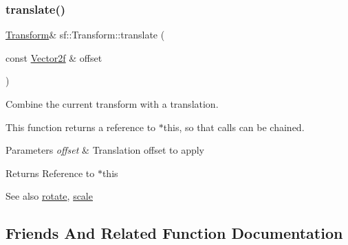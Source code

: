 \subsubsection{\texorpdfstring{translate()}{translate()}\hspace{0.1cm}{\footnotesize\ttfamily [2/2]}}
{\footnotesize\ttfamily \mbox{\hyperlink{classsf_1_1_transform}{Transform}}\& sf\+::\+Transform\+::translate (\begin{DoxyParamCaption}\item[{const \mbox{\hyperlink{classsf_1_1_vector2}{Vector2f}} \&}]{offset }\end{DoxyParamCaption})}



Combine the current transform with a translation. 

This function returns a reference to $\ast$this, so that calls can be chained. 
\begin{DoxyCode}{0}
\end{DoxyCode}



\begin{DoxyParams}{Parameters}
{\em offset} & Translation offset to apply\\
\hline
\end{DoxyParams}
\begin{DoxyReturn}{Returns}
Reference to $\ast$this
\end{DoxyReturn}
\begin{DoxySeeAlso}{See also}
\mbox{\hyperlink{classsf_1_1_transform_a3e548c3c9e3fb9d4bd43cf852669e555}{rotate}}, \mbox{\hyperlink{classsf_1_1_transform_a3f46af807f69d74120fb836334268671}{scale}} \begin{DoxyVerb}\end{DoxyVerb}
 
\end{DoxySeeAlso}


\subsection{Friends And Related Function Documentation}
\mbox{\label{classsf_1_1_transform_ae8ea92b5f2531547173b510b5fe80eb9}} 
